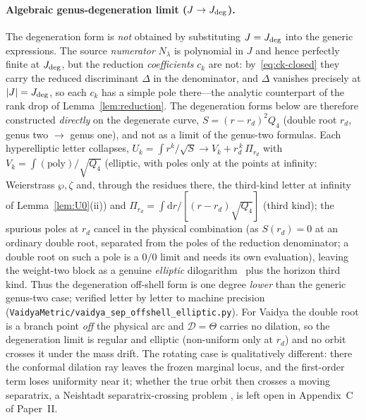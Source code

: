 \documentclass[12pt]{iopart}
\newcommand{\Jc}{J_{\rm deg}}
\newcommand{\dd}{\mathrm{d}}
\theoremstyle{plain}
\theoremstyle{definition}
\theoremstyle{plain}
\theoremstyle{remark}
\begin{document}
\paragraph{Algebraic genus-degeneration limit ($J\to\Jc$).} The degeneration form is
\emph{not} obtained by substituting $J=\Jc$ into the generic expressions. The source
\emph{numerator} $N_\lambda$ is polynomial in $J$ and hence perfectly finite at $\Jc$, but
the reduction \emph{coefficients} $c_k$ are not: by~\eqref{eq:ck-closed} they carry the
reduced discriminant $\Delta$ in the denominator, and $\Delta$ vanishes precisely at
$|J|=\Jc$, so each $c_k$ has a simple pole there---the analytic counterpart of the rank
drop of Lemma~\ref{lem:reduction}. The degeneration forms below are therefore constructed
\emph{directly} on the degenerate curve, $S=(r-r_d)^2Q_4$ (double root $r_d$, genus two
$\to$ genus one), and not as a limit of the genus-two formulas. Each hyperelliptic letter collapses,
$U_k=\int r^k/\sqrt S\to V_k+r_d^{\,k}\,\Pi_{r_d}$ with $V_k=\int(\text{poly})/\sqrt{Q_4}$
(elliptic, with poles only at the points at infinity: Weierstrass $\wp,\zeta$ and, through
the residues there, the third-kind letter at infinity of Lemma~\ref{lem:U0}(ii)) and $\Pi_{r_d}=\int\dd r/[(r-r_d)\sqrt{Q_4}]$
(third kind); the spurious poles at $r_d$ cancel in the physical combination (as
$S(r_d)=0$ at an ordinary double root, separated from the poles of the reduction
denominator; a double root on such a pole is a $0/0$ limit and needs its own
evaluation), leaving the weight-two block as a genuine \emph{elliptic}
dilogarithm~\cite{BeilinsonLevin1994,Zagier1990} plus the horizon third kind. Thus the
degeneration off-shell form is one degree \emph{lower} than the generic genus-two case;
verified letter by letter to machine precision
(\texttt{VaidyaMetric/vaidya\_sep\_offshell\_elliptic.py}). For Vaidya the double root is a
branch point \emph{off} the physical arc and $\mathcal D=\Theta$ carries no dilation, so
the degeneration limit is regular and elliptic (non-uniform only at $r_d$) and no
orbit crosses it under the mass drift. The rotating case is qualitatively
different: there the conformal dilation ray leaves the frozen marginal locus, and the
first-order term loses uniformity near it; whether the true orbit then crosses a moving
separatrix, a Neishtadt separatrix-crossing problem \cite{Neishtadt1986}, is left open
in Appendix~C of Paper~II.



\FloatBarrier


\end{document}
